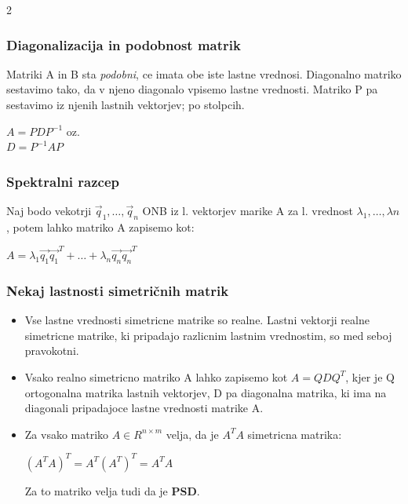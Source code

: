 \documentclass{article}
\begin{document}
\begin{multicols}{2}
	\subsubsection{Diagonalizacija in podobnost matrik}

	Matriki A in B sta \textit{podobni}, ce imata
	obe iste lastne vrednosi. Diagonalno matriko sestavimo tako, da v njeno diagonalo vpisemo lastne vrednosti. Matriko
	P pa sestavimo iz njenih lastnih vektorjev; po stolpcih.
	\begin{center}
		\begin{math}
			A = PDP^{-1}
		\end{math} oz.\\
		\begin{math}
			D = P^{-1}AP
		\end{math}
	\end{center}

	\subsubsection{Spektralni razcep}

	Naj bodo vekotrji $\vec{q}_{1}, \dots, \vec{q}_{n}$ ONB iz l. vektorjev marike A za l. vrednost $\lambda_{1}, \dots, \lambda{n}$,
	potem lahko matriko A zapisemo kot:
	\begin{center}
		\begin{math}
			A = \lambda_{1} \vec{q_{1}} \vec{q_{1}}^{T} + \dots + \lambda_{n} \vec{q_{n}} \vec{q_{n}}^{T}
		\end{math}
	\end{center}

	\subsubsection{Nekaj lastnosti simetričnih matrik}

	\begin{itemize}
		\item Vse lastne vrednosti simetricne matrike so realne. Lastni vektorji realne simetricne matrike, ki
		      pripadajo razlicnim lastnim vrednostim, so med seboj pravokotni.
		\item Vsako realno simetricno matriko A lahko zapisemo kot $A = QDQ^{T}$, kjer je Q ortogonalna matrika lastnih vektorjev, D pa diagonalna matrika,
		      ki ima na diagonali pripadajoce lastne vrednosti matrike A.
		\item Za vsako matriko $A \in R^{n \times m}$ velja, da je $A^T A$ simetricna matrika:
		      \begin{center}
			      \begin{math}
				      (A^T A)^T = A^T(A^T)^T = A^TA
			      \end{math}
		      \end{center}
		      Za to matriko velja tudi da je \textbf{PSD}.
	\end{itemize}


\end{multicols}
\end{document}
